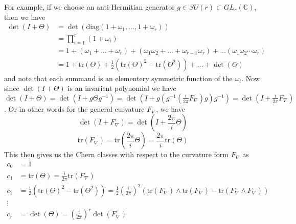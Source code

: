 \documentclass[a4paper]{article}
\theoremstyle{definition} \newtheorem*{definition}{Definition}
\theoremstyle{definition} \newtheorem*{definitions}{Definitions}
\theoremstyle{plain} \newtheorem{theorem}{Theorem}[section]
\theoremstyle{plain} \newtheorem{proposition}[theorem]{Proposition}
\theoremstyle{plain} \newtheorem{corollary}[theorem]{Corollary}
\theoremstyle{plain} \newtheorem{lemma}[theorem]{Lemma}
\theoremstyle{plain} \newtheorem{example}[theorem]{Example}
\newcommand{\complexnos}{\mathbb{C}}
\newcommand{\tr}{\text{tr}}
\begin{document}
For example, if we choose an anti-Hermitian generator $g\in SU(r)\subset GL_r(\complexnos)$, then we have
\begin{align*}
    \det(I+\Theta) &= \det (\text{diag}(1+\omega_1, \ldots, 1+\omega_r)) \\
    & = \prod_{i=1}^r (1+\omega_i) \\
    & = 1 + (\omega_1 + \ldots + \omega_r) + (\omega_1\omega_2 +\ldots + \omega_{r-1}\omega_r) + \ldots (\omega_1\omega_2\cdots \omega_r) \\
    & = 1 + \tr(\Theta) + \frac{1}{2}(\tr(\Theta)^2 - \tr(\Theta^2)) + \ldots + \det (\Theta) 
\end{align*}
and note that each summand is an elementery symmetric function of the $\omega_i$.
Now since $\det(I+\Theta)$ is an invarient polynomial we have $\det(I+\Theta)=\det(I+g\Theta g^{-1})=\det(I+g (g^{-1} (\frac{i}{2\pi} F_\nabla) g) g^{-1}) = \det (I+ \frac{i}{2\pi} F_\nabla)$. 
Or in other words for the general curvature $F_\nabla$, we have 
$$\det(I+F_\nabla)=\det(I+\frac{2\pi}{i}\Theta)$$
$$\tr(F_\nabla)= \tr( \frac{2\pi}{i} \Theta)= \frac{2\pi}{i} \tr(\Theta)$$
This then gives us the Chern classes with respect to the curvature form $F_\nabla$ as
\begin{align*}
    c_0 & = 1 \\
    c_1 & = \tr(\Theta) = \frac{i}{2\pi} \tr(F_\nabla)
    \\
     c_2 & = \frac{1}{2}(\tr(\Theta)^2 - \tr(\Theta^2))  = \frac{1}{2} \left( \frac{i}{2\pi} \right)^2 (\tr(F_\nabla)\wedge\tr(F_\nabla) - \tr(F_\nabla\wedge F_\nabla)) \\
    \vdots & \\
     c_r & = \det(\Theta)=\left( \frac{i}{2\pi} \right)^r \det(F_\nabla) 
\end{align*}
\end{document}
